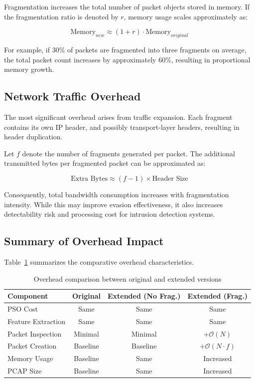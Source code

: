 Fragmentation increases the total number of packet objects stored in memory. If the fragmentation ratio is denoted by $r$, memory usage scales approximately as:

\begin{equation}
\text{Memory}_{new} \approx (1 + r) \cdot \text{Memory}_{original}
\end{equation}

For example, if 30\% of packets are fragmented into three fragments on average, the total packet count increases by approximately 60\%, resulting in proportional memory growth.

\subsection{Network Traffic Overhead}

The most significant overhead arises from traffic expansion. Each fragment contains its own IP header, and possibly transport-layer headers, resulting in header duplication.

Let $f$ denote the number of fragments generated per packet. The additional transmitted bytes per fragmented packet can be approximated as:

\begin{equation}
\text{Extra Bytes} \approx (f - 1) \times \text{Header Size}
\end{equation}

Consequently, total bandwidth consumption increases with fragmentation intensity. While this may improve evasion effectiveness, it also increases detectability risk and processing cost for intrusion detection systems.

\subsection{Summary of Overhead Impact}

Table~\ref{tab:overhead_summary} summarizes the comparative overhead characteristics.

\begin{table}[h]
\centering
\caption{Overhead comparison between original and extended versions}
\label{tab:overhead_summary}
\begin{tabular}{lccc}
\hline
Component & Original & Extended (No Frag.) & Extended (Frag.) \\
\hline
PSO Cost & Same & Same & Same \\
Feature Extraction & Same & Same & Same \\
Packet Inspection & Minimal & Minimal & +$\mathcal{O}(N)$ \\
Packet Creation & Baseline & Baseline & +$\mathcal{O}(N \cdot f)$ \\
Memory Usage & Baseline & Same & Increased \\
PCAP Size & Baseline & Same & Increased \\
\hline
\end{tabular}
\end{table}

